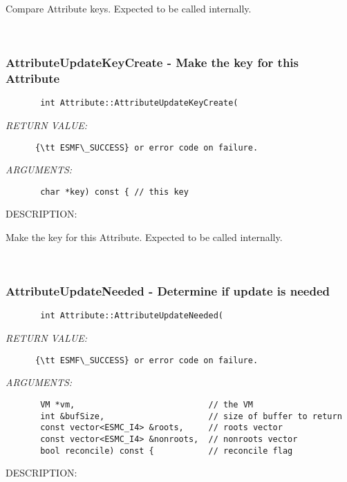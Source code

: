       Compare Attribute keys.
      Expected to be called internally.
   
 
\mbox{}\hrulefill\
 
\subsubsection [AttributeUpdateKeyCreate] {AttributeUpdateKeyCreate - Make the key for this Attribute}


  
\begin{verbatim}       int Attribute::AttributeUpdateKeyCreate(\end{verbatim}{\em RETURN VALUE:}
\begin{verbatim}      {\tt ESMF\_SUCCESS} or error code on failure.\end{verbatim}{\em ARGUMENTS:}
\begin{verbatim}       char *key) const { // this key\end{verbatim}
{\sf DESCRIPTION:\\ }


      Make the key for this Attribute.
      Expected to be called internally.
   
 
\mbox{}\hrulefill\
 
\subsubsection [AttributeUpdateNeeded] {AttributeUpdateNeeded - Determine if update is needed}


  
\begin{verbatim}       int Attribute::AttributeUpdateNeeded(\end{verbatim}{\em RETURN VALUE:}
\begin{verbatim}      {\tt ESMF\_SUCCESS} or error code on failure.\end{verbatim}{\em ARGUMENTS:}
\begin{verbatim}       VM *vm,                           // the VM
       int &bufSize,                     // size of buffer to return
       const vector<ESMC_I4> &roots,     // roots vector
       const vector<ESMC_I4> &nonroots,  // nonroots vector
       bool reconcile) const {           // reconcile flag\end{verbatim}
{\sf DESCRIPTION:\\ }


